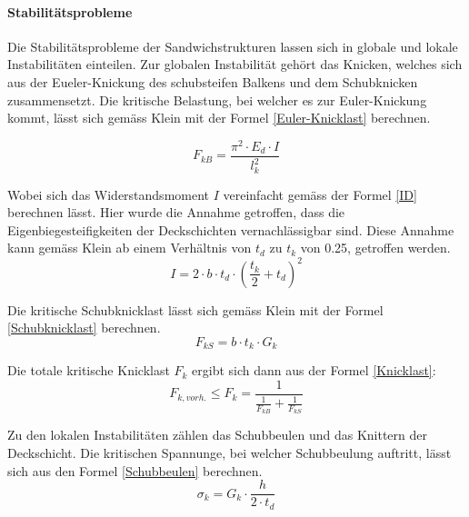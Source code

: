     \paragraph{Stabilitätsprobleme}
    Die Stabilitätsprobleme der Sandwichstrukturen lassen sich in globale und lokale Instabilitäten einteilen. Zur globalen Instabilität gehört das Knicken, welches sich aus der Eueler-Knickung des schubsteifen Balkens und dem Schubknicken zusammensetzt. Die kritische Belastung, bei welcher es zur Euler-Knickung kommt, lässt sich gemäss Klein \cite{klein} mit der Formel \ref{Euler-Knicklast} berechnen.

    \begin{equation}
      \label{Euler-Knicklast}
      F_{kB}=\frac{\pi^2 \cdot E_d \cdot I}{l_k^{2}}
    \end{equation}

    Wobei sich das Widerstandsmoment $I$ vereinfacht gemäss der Formel \ref{ID} berechnen lässt. Hier wurde die Annahme getroffen, dass die Eigenbiegesteifigkeiten der Deckschichten vernachlässigbar sind. Diese Annahme kann gemäss Klein \cite{klein} ab einem Verhältnis von $t_d$ zu $t_k$ von 0.25, getroffen werden.
    \begin{equation}
      \label{ID}
      I= 2 \cdot b \cdot t_d \cdot \left( \frac{t_k}{2} + t_d \right )^{2}
    \end{equation}

    Die kritische Schubknicklast lässt sich gemäss Klein \cite{klein} mit der Formel \ref{Schubknicklast} berechnen.
    \begin{equation}
      \label{Schubknicklast}
      F_{kS} = b \cdot t_k \cdot G_k
    \end{equation}

    Die totale kritische Knicklast \(F_k\) ergibt sich dann aus der Formel \ref{Knicklast}:
    \begin{equation}
      \label{Knicklast}
      F_{k, vorh.} \leq F_k=\frac{1}{\frac{1}{F_{kB}}+\frac{1}{F_{kS}}}
    \end{equation}

    Zu den lokalen Instabilitäten zählen das Schubbeulen und das Knittern der Deckschicht. Die kritischen Spannunge, bei welcher Schubbeulung auftritt, lässt sich aus den Formel \ref{Schubbeulen} berechnen. \cite{ETH}
    \begin{equation}
      \label{Schubbeulen}
      \sigma_k = G_k \cdot \frac{h}{2 \cdot t_d}
    \end{equation}

